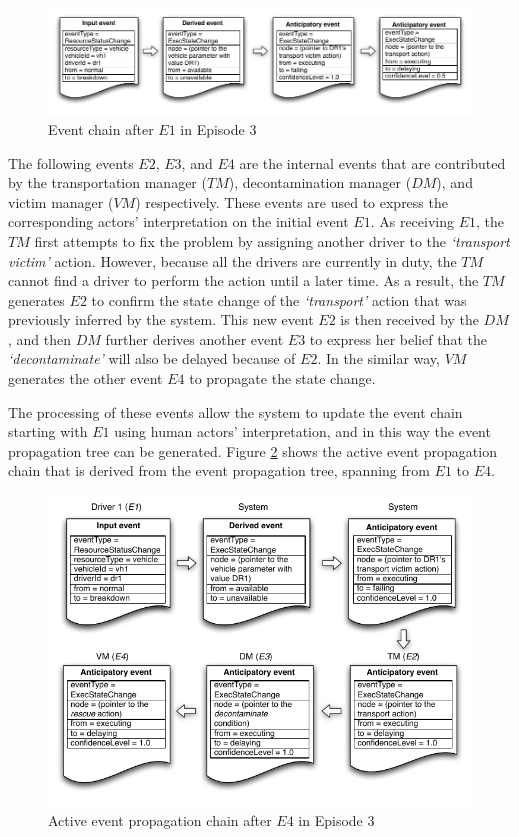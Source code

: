 \begin{figure}[htbp] %
	\centering
	\includegraphics[width=5.8in]{eventchain_ep3_e1.pdf} 
	\caption{Event chain after $E1$ in Episode 3}
	\label{fig:eventchain_ep3_e1}
\end{figure}

The following events $E2$, $E3$, and $E4$ are the internal events that are contributed by the transportation manager ($TM$), decontamination manager ($DM$), and victim manager ($VM$) respectively. These events are used to express the corresponding actors' interpretation on the initial event $E1$. As receiving $E1$, the $TM$ first attempts to fix the problem by assigning another driver to the \emph{`transport victim'} action. However, because all the drivers are currently in duty, the $TM$ cannot find a driver to perform the action until a later time. As a result, the $TM$ generates $E2$ to confirm the state change of the \emph{`transport'} action that was previously inferred by the system. This new event $E2$ is then received by the $DM$, and then $DM$ further derives another event $E3$ to express her belief that the \emph{`decontaminate'} will also be delayed because of $E2$. In the similar way, $VM$ generates the other event $E4$ to propagate the state change. 

The processing of these events allow the system to update the event chain starting with $E1$ using human actors' interpretation, and in this way the event propagation tree can be generated. Figure \ref{fig:eventchain_ep3_e4} shows the active event propagation chain that is derived from the event propagation tree, spanning from $E1$ to $E4$.

\begin{figure}[htbp] %
	\centering
	\includegraphics{eventchain_ep3_e4.pdf} 
	\caption{Active event propagation chain after $E4$ in Episode 3}
	\label{fig:eventchain_ep3_e4}
\end{figure}

